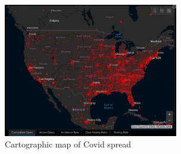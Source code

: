 \begin{figure}[h]
 \centering %
 \includegraphics[width=3in]{figs/JHU_Covid.png}
 \caption{Cartographic map of Covid spread}
 \label{fig:JHU_Covid}
\end{figure}
